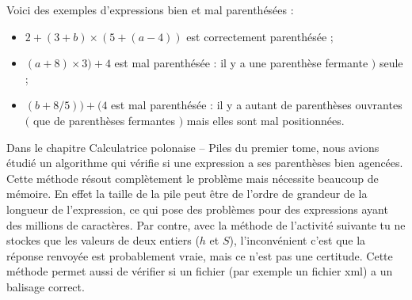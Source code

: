 \documentclass[11pt,class=report,crop=false]{standalone}
\begin{document}

\begin{cours}
Voici des exemples d'expressions bien et mal parenthésées :
\begin{itemize}
	\item $2 + (3 + b) \times (5 + (a - 4))$ est correctement parenthésée ;
	\item $(a+ 8) \times 3 ) + 4$ est mal parenthésée : il y a une parenthèse fermante \og{}$)$\fg{}  seule ;
	\item $(b + 8 / 5)) + (4$ est mal parenthésée : il y a autant de parenthèses ouvrantes 
	\og{}$($\fg{} que de parenthèses fermantes \og{}$)$\fg{} mais elles sont mal positionnées.
\end{itemize}


Dans le chapitre \og{}Calculatrice polonaise – Piles\fg{} du premier tome, nous avions étudié un algorithme qui vérifie si une expression a ses parenthèses bien agencées. 
Cette méthode résout complètement le problème mais nécessite beaucoup de mémoire. En effet la taille de la pile peut être de l'ordre de grandeur de la longueur de l'expression, ce qui pose des problèmes pour des expressions ayant des millions de caractères. Par contre, avec la méthode de l'activité suivante tu ne stockes que les valeurs de deux entiers ($h$ et $S$), l'inconvénient c'est que la réponse renvoyée est probablement vraie,
mais ce n'est pas une certitude. 
Cette méthode permet aussi de vérifier si un fichier (par exemple un fichier \og{}xml\fg{}) a un balisage correct.
\end{cours}



\end{document}
